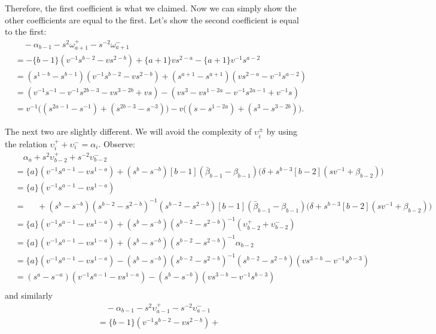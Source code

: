 Therefore, the first coefficient is what we claimed. Now we can simply show the other coefficients are equal to the first. Let's show the second coefficient is equal to the first:
\begin{align*}
&\quad-\alpha_{b-1} - s^2 \omega_{a+1}^+ - s^{-2} \omega_{a+1}^- \\
&= -\{b-1\}(v^{-1}s^{b-2}-vs^{2-b}) + \{a+1\}vs^{2-a} - \{a+1\}v^{-1}s^{a-2} \\
&= (s^{1-b} - s^{b-1} ) (v^{-1}s^{b-2} - vs^{2-b}) + (s^{a+1}-s^{a+1})(vs^{2-a} - v^{-1}s^{a-2}) \\
&= (v^{-1}s^{-1} - v^{-1}s^{2b-3} - vs^{3-2b} + vs) - (vs^3 - vs^{1-2a} - v^{-1}s^{2a-1} + v^{-1}s) \\
&= v^{-1} \big( (s^{2a-1} - s^{-1}) + (s^{2b-3} - s^{-3}) \big) - v \big( ( s - s^{1-2a}) + (s^3 - s^{3-2b}) \big).
\end{align*}

The next two are slightly different. We will avoid the complexity of $\upsilon_i^\pm$ by using the relation $\upsilon_i^+ + \upsilon_i^- = \alpha_i$. Observe:
\begin{align*}
& \quad \alpha_a + s^2 \upsilon_{b-2}^+ + s^{-2}\upsilon_{b-2}^- \\
&= \{a\}(v^{-1}s^{a-1} - vs^{1-a}) + (s^{b} - s^{-b}) [b-1] (\bar{\beta}_{b-1} - \beta_{b-1}) \big(\delta + s^{b-3}[b-2](sv^{-1}+\beta_{b-2})\big) \\
&= \{a\}(v^{-1}s^{a-1}-vs^{1-a}) \\
&= \quad\,\, + (s^{b} - s^{-b})(s^{b-2}-s^{2-b})^{-1}(s^{b-2}-s^{2-b})[b-1] (\bar{\beta}_{b-1} - \beta_{b-1}) \big(\delta + s^{b-3}[b-2](sv^{-1}+\beta_{b-2})\big) \\
&= \{a\}(v^{-1}s^{a-1}-vs^{1-a}) + (s^{b} - s^{-b})(s^{b-2}-s^{2-b})^{-1}(\upsilon_{b-2}^+ + \upsilon_{b-2}^-) \\
&= \{a\}(v^{-1}s^{a-1}-vs^{1-a}) + (s^{b} - s^{-b})(s^{b-2}-s^{2-b})^{-1}\alpha_{b-2} \\
&= \{a\}(v^{-1}s^{a-1}-vs^{1-a}) - (s^{b} - s^{-b})(s^{b-2}-s^{2-b})^{-1}(s^{b-2}-s^{2-b})(vs^{3-b}-v^{-1}s^{b-3}) \\
&= (s^a - s^{-a})(v^{-1}s^{a-1}-vs^{1-a}) - (s^{b} - s^{-b})(vs^{3-b}-v^{-1}s^{b-3}) \\
\end{align*}
and similarly
\begin{align*}
& \quad -\alpha_{b-1} - s^2 \upsilon_{a-1}^+ - s^{-2} \upsilon_{a-1}^- \\
&= \{b-1\}(v^{-1}s^{b-2} - vs^{2-b}) +
\end{align*} 









